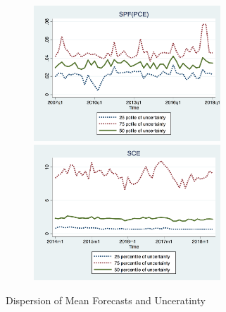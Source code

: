 \documentclass[12pt]{article}
\begin{document}
\begin{figure}[p]
\begin{subfigure}[b]{0.5\textwidth}
		\smallskip
		\includegraphics[width=7cm]{figures/IQRvarPCEQ.png}
		\smallskip
		\includegraphics[width=7cm]{figures/IQRvarSCEM.png}
		\end{subfigure}
		\caption{Dispersion of Mean Forecasts and Unceratinty }
		\label{IQR_Unceratitny}
	\end{figure}
	
\end{document}
